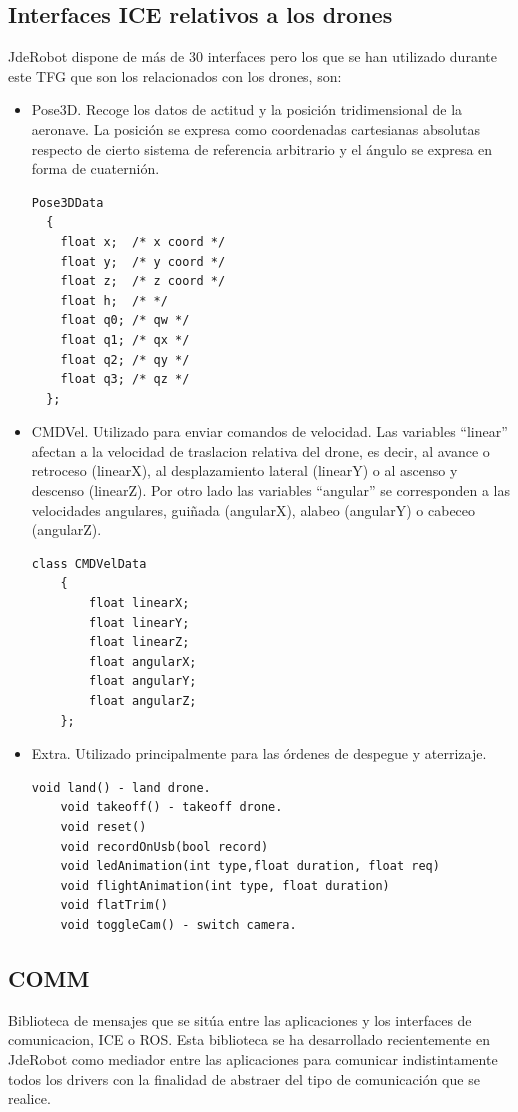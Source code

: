 \subsection{Interfaces ICE relativos a los drones}
JdeRobot dispone de más de 30 interfaces pero los que se han utilizado durante este TFG que son los relacionados con los drones, son:
\begin{itemize}
\item Pose3D. Recoge los datos de actitud y la posici\'on tridimensional de la aeronave. La posición se expresa como coordenadas cartesianas absolutas respecto de cierto sistema de referencia arbitrario
y el ángulo se expresa en forma de cuaternión. 

\begin{lstlisting}[frame=single]
Pose3DData
  {
	float x;  /* x coord */
	float y;  /* y coord */
	float z;  /* z coord */
  	float h;  /* */
	float q0; /* qw */
	float q1; /* qx */
	float q2; /* qy */
	float q3; /* qz */
  };
\end{lstlisting}

\item CMDVel. Utilizado para enviar comandos de velocidad. Las variables ``linear'' afectan a la velocidad de traslacion relativa del drone, es decir, al avance o retroceso (linearX), al desplazamiento lateral (linearY) o al ascenso y descenso (linearZ). Por otro lado las variables ``angular'' se corresponden a las velocidades angulares, guiñada (angularX), alabeo (angularY) o cabeceo (angularZ). 
\begin{lstlisting}[frame=single]
	class CMDVelData
	{
		float linearX;
		float linearY;
		float linearZ;
		float angularX;
		float angularY;
		float angularZ;										
	};
\end{lstlisting}
\item Extra. Utilizado principalmente para las órdenes de despegue y aterrizaje.
\begin{lstlisting}[frame=single]
    void land() - land drone. 
    void takeoff() - takeoff drone. 
    void reset() 
    void recordOnUsb(bool record) 
    void ledAnimation(int type,float duration, float req) 
    void flightAnimation(int type, float duration) 
    void flatTrim() 
    void toggleCam() - switch camera. 
\end{lstlisting}

\end{itemize}

\clearpage
\subsection{COMM}
Biblioteca de mensajes que se sitúa entre las aplicaciones y los interfaces de comunicacion, ICE o ROS. Esta biblioteca se ha desarrollado recientemente en JdeRobot como mediador entre las aplicaciones para comunicar indistintamente todos los drivers con la finalidad de abstraer del tipo de comunicación que se realice.

